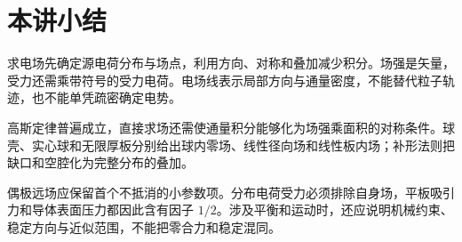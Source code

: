 \section{本讲小结}

求电场先确定源电荷分布与场点，利用方向、对称和叠加减少积分。场强是矢量，受力还需乘带符号的受力电荷。电场线表示局部方向与通量密度，不能替代粒子轨迹，也不能单凭疏密确定电势。

高斯定律普遍成立，直接求场还需使通量积分能够化为场强乘面积的对称条件。球壳、实心球和无限厚板分别给出球内零场、线性径向场和线性板内场；补形法则把缺口和空腔化为完整分布的叠加。

偶极远场应保留首个不抵消的小参数项。分布电荷受力必须排除自身场，平板吸引力和导体表面压力都因此含有因子 $1/2$。涉及平衡和运动时，还应说明机械约束、稳定方向与近似范围，不能把零合力和稳定混同。

